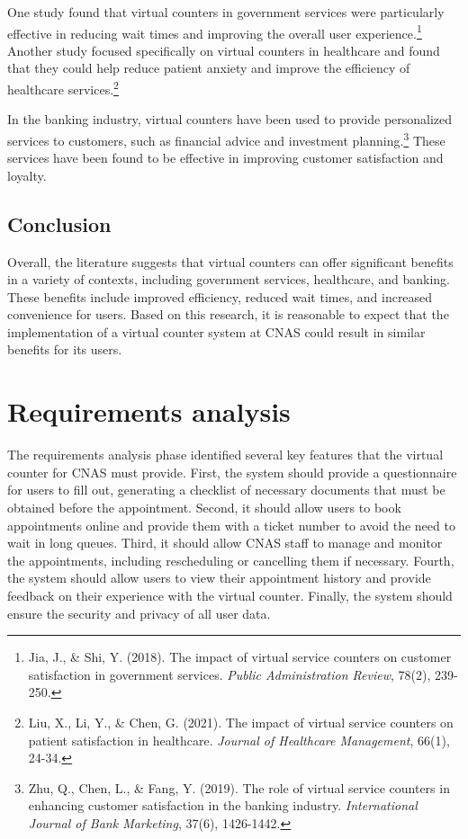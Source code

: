 One study found that virtual counters in government services were particularly effective in reducing wait times and improving the overall user experience.\footnote{Jia, J., \& Shi, Y. (2018). The impact of virtual service counters on customer satisfaction in government services. \textit{Public Administration Review}, 78(2), 239-250.} Another study focused specifically on virtual counters in healthcare and found that they could help reduce patient anxiety and improve the efficiency of healthcare services.\footnote{Liu, X., Li, Y., \& Chen, G. (2021). The impact of virtual service counters on patient satisfaction in healthcare. \textit{Journal of Healthcare Management}, 66(1), 24-34.}

In the banking industry, virtual counters have been used to provide personalized services to customers, such as financial advice and investment planning.\footnote{Zhu, Q., Chen, L., \& Fang, Y. (2019). The role of virtual service counters in enhancing customer satisfaction in the banking industry. \textit{International Journal of Bank Marketing}, 37(6), 1426-1442.} These services have been found to be effective in improving customer satisfaction and loyalty.
\subsection{Conclusion}
Overall, the literature suggests that virtual counters can offer significant benefits in a variety of contexts, including government services, healthcare, and banking. These benefits include improved efficiency, reduced wait times, and increased convenience for users. Based on this research, it is reasonable to expect that the implementation of a virtual counter system at CNAS could result in similar benefits for its users.

\section{Requirements analysis}
The requirements analysis phase identified several key features that the virtual counter for CNAS must provide. First, the system should provide a questionnaire for users to fill out, generating a checklist of necessary documents that must be obtained before the appointment. Second, it should allow users to book appointments online and provide them with a ticket number to avoid the need to wait in long queues. Third, it should allow CNAS staff to manage and monitor the appointments, including rescheduling or cancelling them if necessary. Fourth, the system should allow users to view their appointment history and provide feedback on their experience with the virtual counter. Finally, the system should ensure the security and privacy of all user data. 
\medskip 

